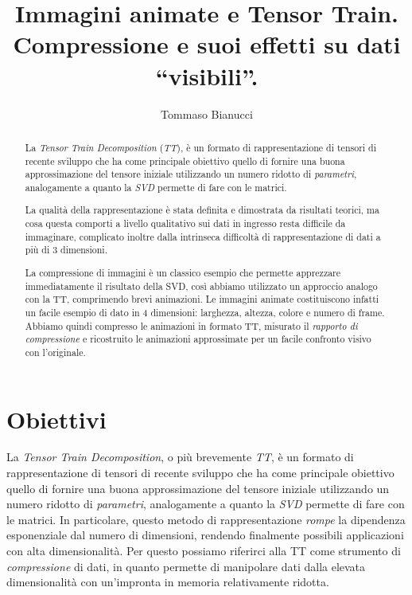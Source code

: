 \documentclass[11pt,a4paper]{article}
\title{Immagini animate e Tensor Train.\\Compressione e suoi effetti su dati ``visibili''.}
\author{Tommaso Bianucci}
\begin{document}
\maketitle

\begin{abstract}
  La \emph{Tensor Train Decomposition} (\emph{TT}), è un formato di rappresentazione di tensori di recente sviluppo che ha come principale obiettivo quello di fornire una buona approssimazione del tensore iniziale utilizzando un numero ridotto di \emph{parametri}, analogamente a quanto la \emph{SVD} permette di fare con le matrici.


  La qualità della rappresentazione è stata definita e dimostrata da risultati teorici, ma cosa questa comporti a livello qualitativo sui dati in ingresso resta difficile da immaginare, complicato inoltre dalla intrinseca difficoltà di rappresentazione di dati a più di 3 dimensioni.

  La compressione di immagini è un classico esempio che permette apprezzare immediatamente il risultato della SVD, così abbiamo utilizzato un approccio analogo con la TT, comprimendo brevi animazioni.
  Le immagini animate costituiscono infatti un facile esempio di dato in 4 dimensioni: larghezza, altezza, colore e numero di frame.
  Abbiamo quindi compresso le animazioni in formato TT, misurato il \emph{rapporto di compressione} e ricostruito le animazioni approssimate per un facile confronto visivo con l'originale. 
\end{abstract}


\section{Obiettivi}
La \emph{Tensor Train Decomposition}, o più brevemente \emph{TT}, è un formato di rappresentazione di tensori di recente sviluppo che ha come principale obiettivo quello di fornire una buona approssimazione del tensore iniziale utilizzando un numero ridotto di \emph{parametri}, analogamente a quanto la \emph{SVD} permette di fare con le matrici.
In particolare, questo metodo di rappresentazione \emph{rompe} la dipendenza esponenziale dal numero di dimensioni, rendendo finalmente possibili applicazioni con alta dimensionalità.
Per questo possiamo riferirci alla TT come strumento di \emph{compressione} di dati, in quanto permette di manipolare dati dalla elevata dimensionalità con un'impronta in memoria relativamente ridotta.
\end{document}
